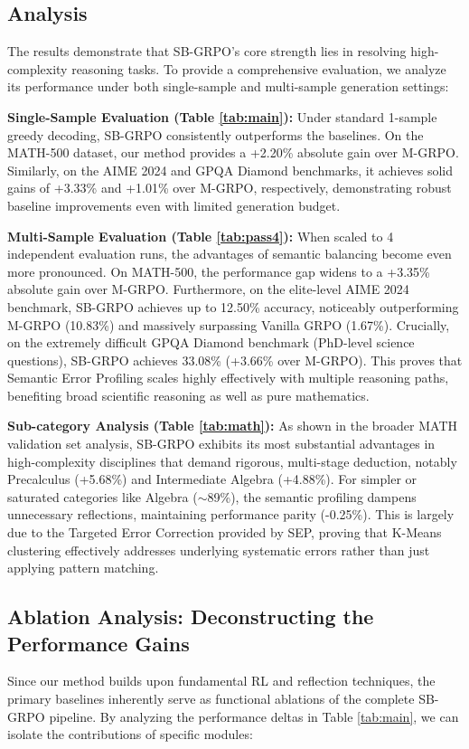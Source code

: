 \subsection{Analysis}
The results demonstrate that SB-GRPO's core strength lies in resolving high-complexity reasoning tasks. To provide a comprehensive evaluation, we analyze its performance under both single-sample and multi-sample generation settings:

\textbf{Single-Sample Evaluation (Table \ref{tab:main}):} Under standard 1-sample greedy decoding, SB-GRPO consistently outperforms the baselines. On the MATH-500 dataset, our method provides a +2.20\% absolute gain over M-GRPO. Similarly, on the AIME 2024 and GPQA Diamond benchmarks, it achieves solid gains of +3.33\% and +1.01\% over M-GRPO, respectively, demonstrating robust baseline improvements even with limited generation budget.

\textbf{Multi-Sample Evaluation (Table \ref{tab:pass4}):} When scaled to 4 independent evaluation runs, the advantages of semantic balancing become even more pronounced. On MATH-500, the performance gap widens to a +3.35\% absolute gain over M-GRPO. Furthermore, on the elite-level AIME 2024 benchmark, SB-GRPO achieves up to 12.50\% accuracy, noticeably outperforming M-GRPO (10.83\%) and massively surpassing Vanilla GRPO (1.67\%). Crucially, on the extremely difficult GPQA Diamond benchmark (PhD-level science questions), SB-GRPO achieves 33.08\% (+3.66\% over M-GRPO). This proves that Semantic Error Profiling scales highly effectively with multiple reasoning paths, benefiting broad scientific reasoning as well as pure mathematics.

\textbf{Sub-category Analysis (Table \ref{tab:math}):} As shown in the broader MATH validation set analysis, SB-GRPO exhibits its most substantial advantages in high-complexity disciplines that demand rigorous, multi-stage deduction, notably Precalculus (+5.68\%) and Intermediate Algebra (+4.88\%). For simpler or saturated categories like Algebra ($\sim$89\%), the semantic profiling dampens unnecessary reflections, maintaining performance parity (-0.25\%). This is largely due to the Targeted Error Correction provided by SEP, proving that K-Means clustering effectively addresses underlying systematic errors rather than just applying pattern matching.

\subsection{Ablation Analysis: Deconstructing the Performance Gains}
Since our method builds upon fundamental RL and reflection techniques, the primary baselines inherently serve as functional ablations of the complete SB-GRPO pipeline. By analyzing the performance deltas in Table \ref{tab:main}, we can isolate the contributions of specific modules:

